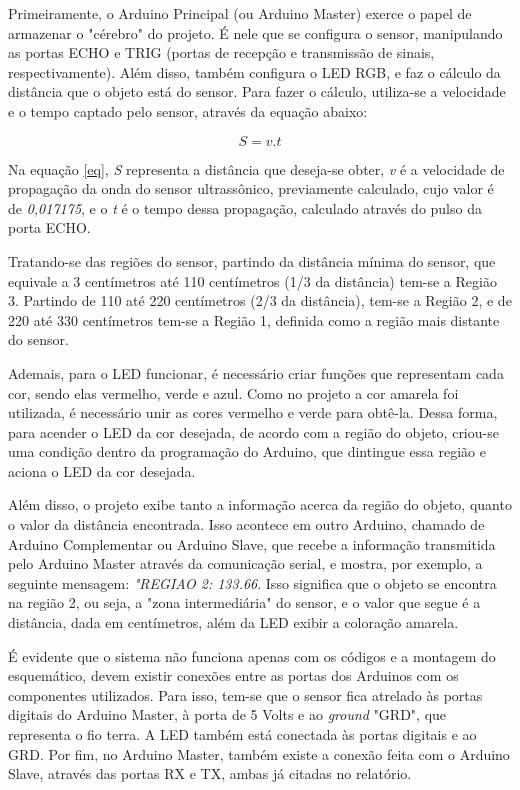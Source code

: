 \documentclass[conference]{IEEEtran}
\begin{document}
    Primeiramente, o Arduino Principal (ou Arduino Master) exerce o papel de armazenar o "cérebro" do 
projeto. É nele que se configura o sensor, manipulando as portas ECHO e TRIG (portas de recepção e 
transmissão de sinais, respectivamente). Além disso, também configura o LED RGB, e faz o cálculo da 
distância que o objeto está do sensor. Para fazer o cálculo, utiliza-se a velocidade e o tempo captado 
pelo sensor, através da equação abaixo:

    \begin{equation}
        S=v.t \label{eq}
    \end{equation}

    Na equação \eqref{eq}, \emph{S} representa a distância que deseja-se obter, \emph{v} é a velocidade
de propagação da onda do sensor ultrassônico, previamente calculado, cujo valor é de \emph{0,017175}, e
o \emph{t} é o tempo dessa propagação, calculado através do pulso da porta ECHO.

    Tratando-se das regiões do sensor,  partindo da distância mínima do sensor, que equivale a
3 centímetros até 110 centímetros (1/3 da distância) tem-se a Região 3. Partindo de 110 até 220 
centímetros (2/3 da distância), tem-se a Região 2, e de 220 até 330 centímetros	tem-se a Região 1,
definida como a região mais distante do sensor.

    Ademais, para o LED funcionar, é necessário criar funções que representam cada cor, sendo elas 
vermelho, verde e azul. Como no projeto a cor amarela foi utilizada, é necessário unir as cores vermelho
e verde para obtê-la. Dessa forma, para acender o LED da cor desejada, de acordo com a região do objeto,
criou-se uma condição dentro da programação do Arduino, que dintingue essa região e aciona o LED da 
cor desejada.

    Além disso, o projeto exibe tanto a informação acerca da região do objeto, quanto o valor da distância
encontrada. Isso acontece em outro Arduino, chamado de Arduino Complementar ou Arduino Slave, que recebe
a informação transmitida pelo Arduino Master através da comunicação serial, e mostra, por exemplo,
a seguinte mensagem: \emph{"REGIAO 2: 133.66}. Isso significa que o objeto se encontra na região 2, 
ou seja, a "zona intermediária" do sensor, e o valor que segue é a distância, dada em centímetros, além
da LED exibir a coloração amarela.

    É evidente que o sistema não funciona apenas com os códigos e a montagem do esquemático, devem existir
conexões entre as portas dos Arduinos com os componentes utilizados. Para isso, tem-se que o sensor fica 
atrelado às portas digitais do Arduino Master, à porta de 5 Volts e ao \emph{ground} "GRD", que representa
o fio terra. A LED também está conectada às portas digitais e ao GRD. Por fim, no Arduino Master, também
existe a conexão feita com o Arduino Slave, através das portas RX e TX, ambas já citadas no relatório.
\end{document}
